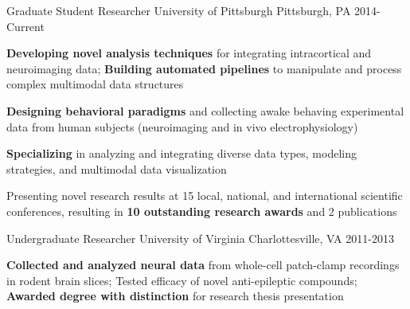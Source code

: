 \vspace*{-0.25cm}

\vspace*{0.3cm}

\begin{cventries}

\cventry
    {Graduate Student Researcher} %
    {University of Pittsburgh} %
    {Pittsburgh, PA} %
    {2014-Current} %
    {
      \begin{cvitems} %
        \item {\textbf{Developing novel analysis techniques} for integrating  intracortical and neuroimaging data; \textbf{Building automated pipelines} to manipulate and process complex multimodal data structures}
        \item {\textbf{Designing behavioral paradigms} and collecting awake behaving experimental data from human subjects (neuroimaging and in vivo electrophysiology)}
		\item {\textbf{Specializing} in analyzing and integrating diverse data types, modeling strategies, and multimodal data visualization}        
        \item {Presenting novel research results at 15 local, national, and international scientific conferences, resulting in \textbf{10 outstanding research awards} and 2 publications}
      \end{cvitems}
    }
    \vspace*{0.2cm}
    
\cventry
    {Undergraduate Researcher}%
    {University of Virginia}
    {Charlottesville, VA} %
    {2011-2013} %
    {
      \begin{cvitems}
      	\item {\textbf{Collected and analyzed neural data} from whole-cell patch-clamp recordings in rodent brain slices; Tested efficacy of novel anti-epileptic compounds; \textbf{Awarded degree with distinction} for research thesis presentation}
      \end{cvitems}
    }
    \vspace*{0.2cm}


\end{cventries}
